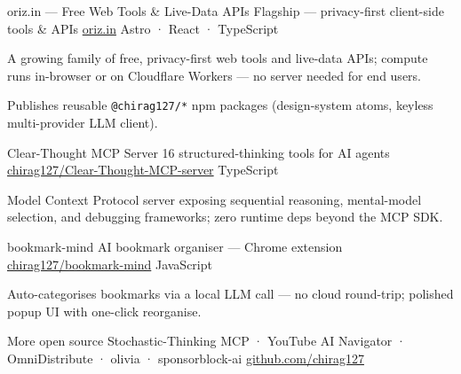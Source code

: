 \documentclass[11pt, a4paper]{awesome-cv}
\begin{document}

\begin{cventries}

  \cventry
    {oriz.in — Free Web Tools \& Live-Data APIs}
    {Flagship — privacy-first client-side tools \& APIs}
    {\href{https://oriz.in}{oriz.in}}
    {Astro · React · TypeScript}
    {
      \begin{cvitems}
        \item A growing family of free, privacy-first web tools and live-data APIs; compute runs in-browser or on Cloudflare Workers — no server needed for end users.
        \item Publishes reusable \texttt{@chirag127/*} npm packages (design-system atoms, keyless multi-provider LLM client).
      \end{cvitems}
    }

  \cventry
    {Clear-Thought MCP Server }
    {16 structured-thinking tools for AI agents}
    {\href{https://github.com/chirag127/Clear-Thought-MCP-server}{chirag127/Clear-Thought-MCP-server}}
    {TypeScript}
    {
      \begin{cvitems}
        \item Model Context Protocol server exposing sequential reasoning, mental-model selection, and debugging frameworks; zero runtime deps beyond the MCP SDK.
      \end{cvitems}
    }

  \cventry
    {bookmark-mind }
    {AI bookmark organiser — Chrome extension}
    {\href{https://github.com/chirag127/bookmark-mind}{chirag127/bookmark-mind}}
    {JavaScript}
    {
      \begin{cvitems}
        \item Auto-categorises bookmarks via a local LLM call — no cloud round-trip; polished popup UI with one-click reorganise.
      \end{cvitems}
    }

  \cventry
    {More open source}
    {Stochastic-Thinking MCP · YouTube AI Navigator · OmniDistribute · olivia · sponsorblock-ai}
    {\href{https://github.com/chirag127}{github.com/chirag127}}
    {}
    {}

\end{cventries}

\end{document}
